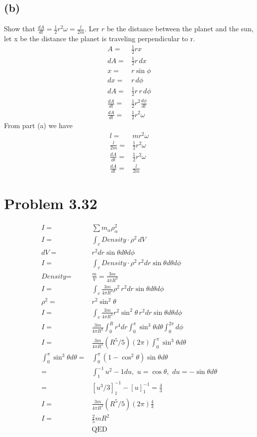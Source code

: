 \documentclass[12pt, a4paper]{article}
\begin{document}
\subsection*{(b)}
Show that $\frac{dA}{dt} = \tfrac{1}{2}r^2\omega = \frac{l}{2m}$. 
Ler $r$ be the distance between the planet and the sun, let x be the 
distance the planet is traveling perpendicular to r. 
\begin{align*}
A =& \frac{1}{2} r  x
\\
dA =& \frac{1}{2} r \, dx
\\
x =& r\sin\phi
\\
dx =& r\, d\phi
\\
dA =& \frac{1}{2} r \,  r\, d\phi
\\
\frac{dA}{dt} =& \frac{1}{2} r^2 \frac{d\phi}{dt}
\\
\frac{dA}{dt} =& \boxed{\frac{1}{2} r^2 \omega}
\end{align*}
From part (a) we have 
\begin{align}
l =&  m r^2\omega
\\
\frac{l}{2m} =&  \frac{1}{2} r^2\omega
\\
\frac{dA}{dt} =& \frac{1}{2} r^2 \omega
\\
\frac{dA}{dt} =&\boxed{\frac{l}{2m}}
\end{align}






\pagebreak
\section*{Problem 3.32}
\begin{align*}
I =& \sum m_\alpha \rho_\alpha^2
\\
I =& \int_v \textit{Density} \cdot \rho^2 \, dV
\\
dV =& r^2 dr \sin\theta d\theta d\phi
\\
I =& \int_v \textit{Density} \cdot \rho^2 \, r^2 dr \sin\theta d\theta d\phi
\\
\textit{Density} =& \frac{m}{V} = \frac{3m}{4\pi R^3}
\\
I =& \int_v \frac{3m}{4\pi R^3} \rho^2 \, r^2 dr \sin\theta d\theta d\phi
\\
\rho^2 =& r^2\sin^2\theta
\\
I =& \int_v \frac{3m}{4\pi R^3} r^2\sin^2\theta \, r^2 dr \sin\theta d\theta d\phi
\\
I =& \frac{3m}{4\pi R^3}
\int_0^R  r^4 dr 
\int_0^\pi\sin^3\theta d\theta 
\int_0^{2\pi} d\phi
\\
I =& \frac{3m}{4\pi R^3}(R^5/5) (2\pi)
\int_0^\pi\sin^3\theta d\theta
\\
\int_0^\pi\sin^3\theta d\theta =& \int_0^\pi (1-\cos^2\theta)\sin\theta d\theta
\\
=& \int_1^{-1} u^2 - 1 du, \,\, u = \cos\theta, \,\, 
du = - \sin\theta d\theta
\\
=& [u^3/3]_1^{-1} - [u]_1^{-1} = \frac{4}{3}
\\
I =& \frac{3m}{4\pi R^3}(R^5/5) (2\pi) \frac{4}{3}
\\
I =& \frac{2}{5}mR^2
\\
&\text{QED}
\end{align*}
\end{document}
